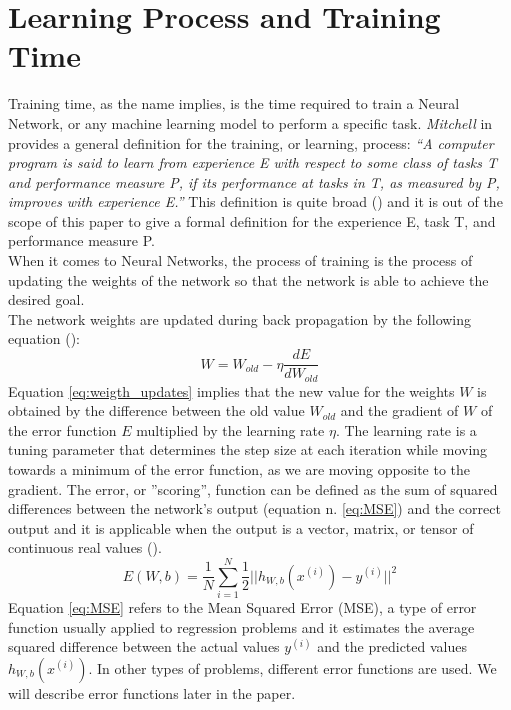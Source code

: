 \section{Learning Process and Training Time}\label{sec:training_time}
Training time, as the name implies, is the time required to train a Neural Network, or any machine learning model to perform a specific task. \textit{Mitchell} in \cite{machine_learning} provides a general definition for the training, or learning, process: \textit{“A computer program is said to learn from experience E with respect to some class of tasks T and performance measure P, if its performance at tasks in T, as measured by P, improves with experience E.”} This definition is quite broad (\cite{Goodfellow-et-al-2016}) and it is out of the scope of this paper to give a formal definition for the experience E, task T, and performance measure P.\\When it comes to Neural Networks, the process of training is the process of updating the weights of the network so that the network is able to achieve the desired goal. \cite{murphy2016overview} \\
The network weights are updated during back propagation by the following equation (\cite{murphy2016overview}):
\begin{equation}
W = W_{old} - \eta \frac{dE}{dW_{old}}
\label{eq:weigth_updates}
\end{equation}
Equation \ref{eq:weigth_updates} implies that the new value for the weights $W$ is obtained by the difference between the old value $W_{old}$ and the gradient of $W$ of the error function $E$ multiplied by the learning rate $\eta$. The learning rate is a tuning parameter that determines the step size at each iteration while moving towards a minimum of the error function, as we are moving opposite to the gradient. 
The error, or ''scoring'', function can be defined as the sum of squared differences between the network's output (equation n. \ref{eq:MSE}) and the correct output and it is applicable when the output is a vector, matrix, or tensor of continuous real values (\cite{murphy2016overview}). 
\begin{equation}
E(W,b) = \frac{1}{N} \sum_{i=1}^{N} \frac{1}{2} \vert \vert h_{W,b} (x^{(i)}) - y^{(i)} \vert \vert ^{2}
\label{eq:MSE}
\end{equation}
Equation \ref{eq:MSE} refers to the Mean Squared Error (MSE), a type of error function usually applied to regression problems and it estimates the average squared difference between the actual values $y^{(i)}$ and the predicted values $h_{W,b} (x^{(i)})$. In other types of problems, different error functions are used. We will describe error functions later in the paper. \\

